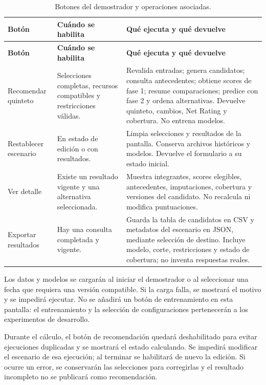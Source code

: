 \begingroup\small{}\setlength{\tabcolsep}{4pt}
\begin{longtable}{@{}>{\raggedright\arraybackslash}p{3.0cm}>{\raggedright\arraybackslash}p{3.1cm}>{\raggedright\arraybackslash}p{8.5cm}@{}}
\caption{Botones del demostrador y operaciones asociadas.}\label{tab:botones-demostrador}\\
\toprule\textbf{Botón}&\textbf{Cuándo se habilita}&\textbf{Qué ejecuta y qué devuelve}\\\midrule\endfirsthead
\toprule\textbf{Botón}&\textbf{Cuándo se habilita}&\textbf{Qué ejecuta y qué devuelve}\\\midrule\endhead
\bottomrule\endfoot
Recomendar quinteto & Selecciones completas, recursos compatibles y restricciones válidas. & Revalida entradas; genera candidatos; consulta antecedentes; obtiene scores de fase 1; resume comparaciones; predice con fase 2 y ordena alternativas. Devuelve quinteto, cambios, Net Rating y cobertura. No entrena modelos.\\
Restablecer escenario & En estado de edición o con resultados. & Limpia selecciones y resultados de la pantalla. Conserva archivos históricos y modelos. Devuelve el formulario a su estado inicial.\\
Ver detalle & Existe un resultado vigente y una alternativa seleccionada. & Muestra integrantes, scores elegibles, antecedentes, imputaciones, cobertura y versiones del candidato. No recalcula ni modifica puntuaciones.\\
Exportar resultados & Hay una consulta completada y vigente. & Guarda la tabla de candidatos en CSV y metadatos del escenario en JSON, mediante selección de destino. Incluye modelo, corte, restricciones y estado de cobertura; no inventa respuestas reales.\\
\end{longtable}\endgroup

Los datos y modelos se cargarán al iniciar el demostrador o al seleccionar una fecha que requiera una versión compatible. Si la carga falla, se mostrará el motivo y se impedirá ejecutar. No se añadirá un botón de entrenamiento en esta pantalla: el entrenamiento y la selección de configuraciones pertenecerán a los experimentos de desarrollo.

Durante el cálculo, el botón de recomendación quedará deshabilitado para evitar ejecuciones duplicadas y se mostrará el estado calculando. Se impedirá modificar el escenario de esa ejecución; al terminar se habilitará de nuevo la edición. Si ocurre un error, se conservarán las selecciones para corregirlas y el resultado incompleto no se publicará como recomendación.

